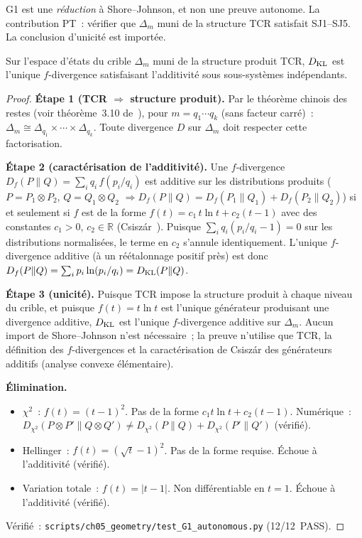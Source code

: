 \documentclass[12pt,a4paper]{article}
\begin{document}
\begin{remarque}[Portée de G1]
G1 est une \emph{réduction} à Shore--Johnson, et non une preuve
autonome. La contribution PT~: vérifier que $\Delta_m$ muni de la
structure TCR satisfait SJ1--SJ5. La conclusion d'unicité est importée.
\end{remarque}

\begin{theoreme}
\label{thm:G1_autonomous}
Sur l'espace d'états du crible $\Delta_m$ muni de la structure produit
TCR, $D_{\mathrm{KL}}$ est l'unique $f$-divergence satisfaisant l'additivité sous
sous-systèmes indépendants.

\begin{proof}
\textbf{Étape 1 (TCR $\Rightarrow$ structure produit).}
Par le théorème chinois des restes (voir théorème~3.10
de~\cite{companion_M1}), pour $m = q_1 \cdots q_k$ (sans facteur
carré)~:
$\Delta_m \cong \Delta_{q_1} \times \cdots \times \Delta_{q_k}$.
Toute divergence $D$ sur $\Delta_m$ doit respecter cette factorisation.

\textbf{Étape 2 (caractérisation de l'additivité).}
Une $f$-divergence $D_f(P\|Q) = \sum_i q_i\,f(p_i/q_i)$ est additive
sur les distributions produits ($P = P_1 \otimes P_2$,
$Q = Q_1 \otimes Q_2$
$\Rightarrow D_f(P\|Q) = D_f(P_1\|Q_1) + D_f(P_2\|Q_2)$) si et
seulement si $f$ est de la forme
$f(t) = c_1\,t\ln t + c_2(t-1)$ avec des constantes $c_1 > 0$,
$c_2 \in \mathbb{R}$ (Csisz\'ar~\cite{Csiszar1967}).
Puisque $\sum_i q_i(p_i/q_i - 1) = 0$ sur les distributions
normalisées, le terme en $c_2$ s'annule identiquement. L'unique
$f$-divergence additive (à un réétalonnage positif près) est donc
$D_f(P\|Q) = \sum_i p_i \ln(p_i/q_i) = D_{\mathrm{KL}}(P\|Q)$.

\textbf{Étape 3 (unicité).}
Puisque TCR impose la structure produit à chaque niveau du crible, et
puisque $f(t) = t\ln t$ est l'unique générateur produisant une
divergence additive, $D_{\mathrm{KL}}$ est l'unique $f$-divergence additive sur
$\Delta_m$. Aucun import de Shore--Johnson n'est nécessaire~; la
preuve n'utilise que TCR, la définition des $f$-divergences et la
caractérisation de Csisz\'ar des générateurs additifs (analyse convexe
élémentaire).

\textbf{Élimination.}
\begin{itemize}[nosep]
\item $\chi^2$~: $f(t) = (t-1)^2$. Pas de la forme
  $c_1 t\ln t + c_2(t-1)$. Numérique~:
  $D_{\chi^2}(P\otimes P' \| Q\otimes Q') \neq D_{\chi^2}(P\|Q) + D_{\chi^2}(P'\|Q')$ (vérifié).
\item Hellinger~: $f(t) = (\sqrt{t}-1)^2$. Pas de la forme requise.
  Échoue à l'additivité (vérifié).
\item Variation totale~: $f(t) = |t-1|$. Non différentiable en $t=1$.
  Échoue à l'additivité (vérifié).
\end{itemize}

\noindent
Vérifié~: \texttt{scripts/ch05\_geometry/test\_G1\_autonomous.py}
(12/12~PASS).
\end{proof}
\end{theoreme}
\end{document}
